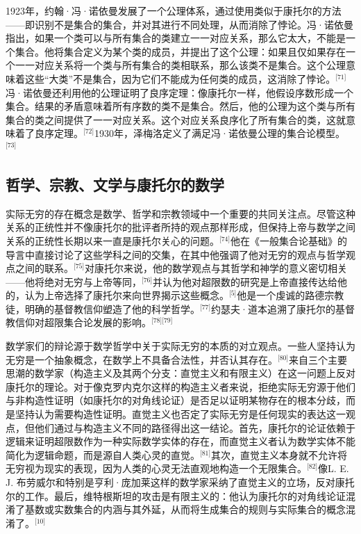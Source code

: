 1923年，约翰·冯·诺依曼发展了一个公理体系，通过使用类似于康托尔的方法——即识别不是集合的集合，并对其进行不同处理，从而消除了悖论。冯·诺依曼指出，如果一个类可以与所有集合的类建立一一对应关系，那么它太大，不能是一个集合。他将集合定义为某个类的成员，并提出了这个公理：如果且仅如果存在一个一一对应关系将一个类与所有集合的类相联系，那么该类不是集合。这个公理意味着这些“大类”不是集合，因为它们不能成为任何类的成员，这消除了悖论。\(^\text{[71]}\)冯·诺依曼还利用他的公理证明了良序定理：像康托尔一样，他假设序数形成一个集合。结果的矛盾意味着所有序数的类不是集合。然后，他的公理为这个类与所有集合的类之间提供了一一对应关系。这个对应关系良序化了所有集合的类，这就意味着了良序定理。\(^\text{[72]}\)1930年，泽梅洛定义了满足冯·诺依曼公理的集合论模型。\(^\text{[73]}\)
\subsection{哲学、宗教、文学与康托尔的数学}
实际无穷的存在概念是数学、哲学和宗教领域中一个重要的共同关注点。尽管这种关系的正统性并不像康托尔的批评者所持的观点那样形成，但保持上帝与数学之间关系的正统性长期以来一直是康托尔关心的问题。\(^\text{[74]}\)他在《一般集合论基础》的导言中直接讨论了这些学科之间的交集，在其中他强调了他对无穷的观点与哲学观点之间的联系。\(^\text{[75]}\)对康托尔来说，他的数学观点与其哲学和神学的意义密切相关——他将绝对无穷与上帝等同，\(^\text{[76]}\)并认为他对超限数的研究是上帝直接传达给他的，认为上帝选择了康托尔来向世界揭示这些概念。\(^\text{[5]}\)他是一个虔诚的路德宗教徒，明确的基督教信仰塑造了他的科学哲学。\(^\text{[77]}\)约瑟夫·道本追溯了康托尔的基督教信仰对超限集合论发展的影响。\(^\text{[78][79]}\)

数学家们的辩论源于数学哲学中关于实际无穷的本质的对立观点。一些人坚持认为无穷是一个抽象概念，在数学上不具备合法性，并否认其存在。\(^\text{[80]}\)来自三个主要思潮的数学家（构造主义及其两个分支：直觉主义和有限主义）在这一问题上反对康托尔的理论。对于像克罗内克尔这样的构造主义者来说，拒绝实际无穷源于他们与非构造性证明（如康托尔的对角线论证）是否足以证明某物存在的根本分歧，而是坚持认为需要构造性证明。直觉主义也否定了实际无穷是任何现实的表达这一观点，但他们通过与构造主义不同的路径得出这一结论。首先，康托尔的论证依赖于逻辑来证明超限数作为一种实际数学实体的存在，而直觉主义者认为数学实体不能简化为逻辑命题，而是源自人类心灵的直觉。\(^\text{[81]}\)其次，直觉主义本身就不允许将无穷视为现实的表现，因为人类的心灵无法直观地构造一个无限集合。\(^\text{[82]}\)像L. E. J. 布劳威尔和特别是亨利·庞加莱这样的数学家采纳了直觉主义的立场，反对康托尔的工作。最后，维特根斯坦的攻击是有限主义的：他认为康托尔的对角线论证混淆了基数或实数集合的内涵与其外延，从而将生成集合的规则与实际集合的概念混淆了。\(^\text{[10]}\)


